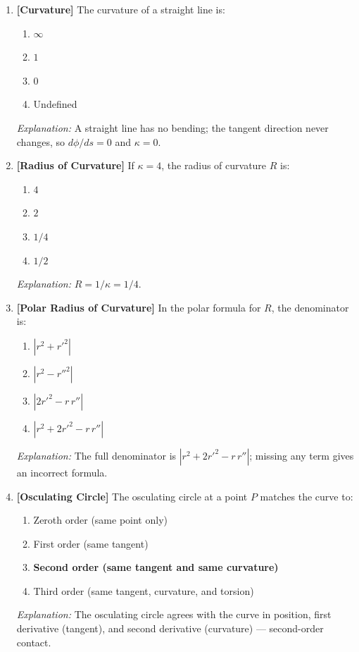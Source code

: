 \documentclass[12pt,a4paper]{article}
\begin{document}
\begin{enumerate}[label=\textbf{Q\arabic*.}]

\item \textbf{[Curvature]} The curvature of a straight line is:
\begin{enumerate}[label=(\Alph*), nosep]
  \item $\infty$
  \item $1$
  \item \textbf{$0$}
  \item Undefined
\end{enumerate}
\textit{Explanation:} A straight line has no bending; the tangent direction never changes, so $d\phi/ds = 0$ and $\kappa = 0$.

\bigskip
\item \textbf{[Radius of Curvature]} If $\kappa = 4$, the radius of curvature $R$ is:
\begin{enumerate}[label=(\Alph*), nosep]
  \item $4$
  \item $2$
  \item \textbf{$1/4$}
  \item $1/2$
\end{enumerate}
\textit{Explanation:} $R = 1/\kappa = 1/4$.

\bigskip
\item \textbf{[Polar Radius of Curvature]} In the polar formula for $R$, the denominator is:
\begin{enumerate}[label=(\Alph*), nosep]
  \item $|r^{2}+r'^{2}|$
  \item $|r^{2}-r''^{2}|$
  \item $|2r'^{2}-r\,r''|$
  \item \textbf{$|r^{2}+2r'^{2}-r\,r''|$}
\end{enumerate}
\textit{Explanation:} The full denominator is $|r^{2}+2r'^{2}-r\,r''|$; missing any term gives an incorrect formula.

\bigskip
\item \textbf{[Osculating Circle]} The osculating circle at a point $P$ matches the curve to:
\begin{enumerate}[label=(\Alph*), nosep]
  \item Zeroth order (same point only)
  \item First order (same tangent)
  \item \textbf{Second order (same tangent and same curvature)}
  \item Third order (same tangent, curvature, and torsion)
\end{enumerate}
\textit{Explanation:} The osculating circle agrees with the curve in position, first derivative (tangent), and second derivative (curvature) --- second-order contact.


\end{enumerate}
\end{document}
